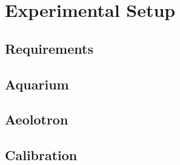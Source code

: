 \chapter{Experimental Setup}
	\section{Requirements}
	\section{Aquarium}
	\section{Aeolotron}
	\section{Calibration}